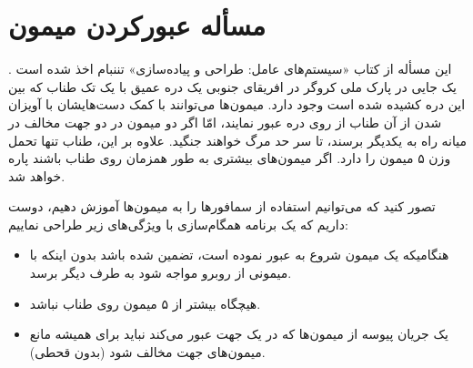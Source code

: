 \documentclass{book}
\begin{document}
\section{مسأله عبورکردن میمون}

    این مسأله از کتاب «سیستم‌های عامل: طراحی و پیاده‌سازی» تننبام اخذ شده است \cite{tanenbaum}.
    یک جایی در پارک ملی کروگر در افریقای جنوبی
    یک دره عمیق با یک تک طناب که بین این دره کشیده شده است وجود دارد. میمون‌ها می‌توانند با کمک دست‌هایشان با آویزان شدن از آن طناب 
    از روی دره عبور نمایند، امّا اگر دو میمون در دو جهت مخالف در میانه راه به یکدیگر برسند، تا سر حد مرگ خواهند جنگید. 
    علاوه بر این،‌ طناب تنها تحمل وزن ۵ میمون را دارد. اگر میمون‌های بیشتری به طور همزمان روی طناب باشند پاره خواهد شد. 

    تصور کنید که می‌توانیم  استفاده از سمافورها را به میمون‌ها آموزش دهیم، دوست داریم که یک برنامه همگام‌سازی با ویژگی‌های زیر طراحی نماییم:

\begin{itemize}

\item 
    هنگامیکه یک میمون شروع به عبور نموده است، تضمین شده باشد بدون اینکه با میمونی از روبرو مواجه شود به طرف دیگر برسد. 

\item %
    هیچگاه بیشتر از ۵ میمون روی طناب نباشد. 

\item %
    یک جریان پیوسه از میمون‌ها که در یک جهت عبور می‌کند نباید برای همیشه مانع میمون‌های جهت مخالف شود (بدون قحطی). 

\end{itemize}
\end{document}
